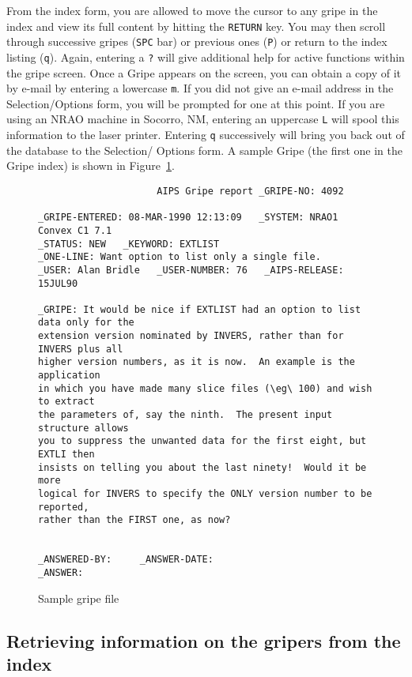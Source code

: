 From the index form, you are allowed to move the cursor to any gripe
in the index and view its full content by hitting the {\tt RETURN}
key.  You may then scroll through successive gripes ({\tt SPC} bar) or
previous ones ({\tt P}) or return to the index listing ({\tt q}).
Again, entering a {\tt ?} will give additional help for active
functions within the gripe screen.  Once a Gripe appears on the
screen, you can obtain a copy of it by e-mail by entering a lowercase
{\tt m}.  If you did not give an e-mail address in the
Selection/Options form, you will be prompted for one at this point. If
you are using an NRAO machine in Socorro, NM, entering an uppercase
{\tt L} will spool this information to the laser printer.  Entering
{\tt q} successively will bring you back out of the database to the
Selection/ Options form. A sample Gripe (the first one in the Gripe
index) is shown in Figure~\ref{fig:sampgripe}.
\begin{figure}
\begin{center}
\begin{verbatim}
                     AIPS Gripe report _GRIPE-NO: 4092

_GRIPE-ENTERED: 08-MAR-1990 12:13:09   _SYSTEM: NRAO1 Convex C1 7.1
_STATUS: NEW   _KEYWORD: EXTLIST
_ONE-LINE: Want option to list only a single file.
_USER: Alan Bridle   _USER-NUMBER: 76   _AIPS-RELEASE:  15JUL90

_GRIPE: It would be nice if EXTLIST had an option to list data only for the
extension version nominated by INVERS, rather than for INVERS plus all
higher version numbers, as it is now.  An example is the application
in which you have made many slice files (\eg\ 100) and wish to extract
the parameters of, say the ninth.  The present input structure allows
you to suppress the unwanted data for the first eight, but EXTLI then
insists on telling you about the last ninety!  Would it be more
logical for INVERS to specify the ONLY version number to be reported,
rather than the FIRST one, as now?


_ANSWERED-BY:     _ANSWER-DATE:
_ANSWER:
\end{verbatim}
\end{center}
\caption{Sample gripe file}
\label{fig:sampgripe}
\end{figure}

\subsection{Retrieving information on the gripers from the index}

